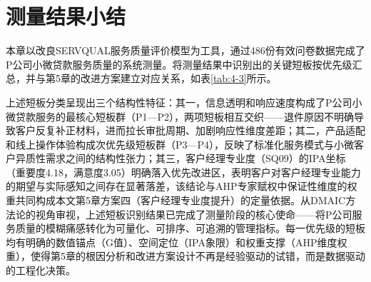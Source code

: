 \section{测量结果小结}

本章以改良SERVQUAL服务质量评价模型为工具，通过486份有效问卷数据完成了P公司小微贷款服务质量的系统测量。将测量结果中识别出的关键短板按优先级汇总，并与第5章的改进方案建立对应关系，如表\ref{tab:4-3}所示。\par

\begin{table}[htbp]
  \centering
  \small
  \caption{关键短板与改进方案对应关系}
  \label{tab:4-3}
\end{table}

上述短板分类呈现出三个结构性特征：其一，信息透明和响应速度构成了P公司小微贷款服务的最核心短板群（P1—P2），两项短板相互交织——退件原因不明确导致客户反复补正材料，进而拉长审批周期、加剧响应性维度差距；其二，产品适配和线上操作体验构成次优先级短板群（P3—P4），反映了标准化服务模式与小微客户异质性需求之间的结构性张力；其三，客户经理专业度（SQ09）的IPA坐标（重要度4.18，满意度3.05）明确落入优先改进区，表明客户对客户经理专业能力的期望与实际感知之间存在显著落差，该结论与AHP专家赋权中保证性维度的权重共同构成本文第5章方案四（客户经理专业度提升）的定量依据。从DMAIC方法论的视角审视，上述短板识别结果已完成了测量阶段的核心使命——将P公司服务质量的模糊痛感转化为可量化、可排序、可追溯的管理指标。每一优先级的短板均有明确的数值锚点（G值）、空间定位（IPA象限）和权重支撑（AHP维度权重），使得第5章的根因分析和改进方案设计不再是经验驱动的试错，而是数据驱动的工程化决策。\par

